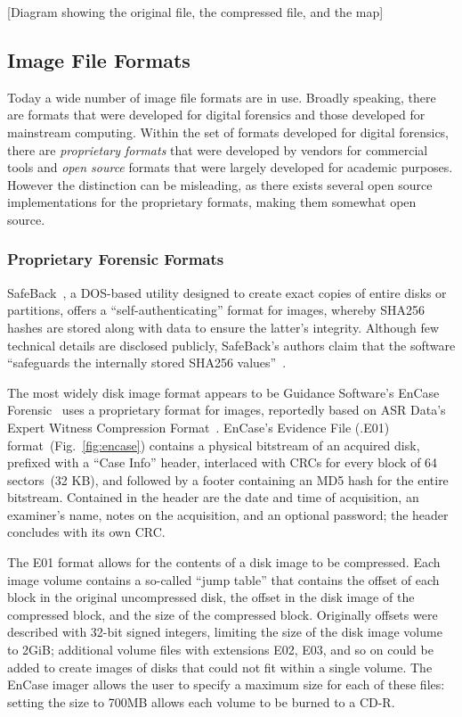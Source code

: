 [Diagram showing the original file, the compressed file, and the map]

\subsection{Image File Formats}
Today a wide number of image file formats are in use. Broadly
speaking, there are formats that were developed for digital forensics
and those developed for mainstream computing. Within the set of
formats developed for digital forensics, there are \emph{proprietary formats} that were developed by
vendors for commercial tools and \emph{open source} formats that were
largely developed for academic purposes. However the distinction can
be misleading, as there exists several open source implementations for
the proprietary formats, making them somewhat open source. 

\subsubsection{Proprietary Forensic Formats}

SafeBack~\cite{safeback}, a DOS-based utility designed to create
exact copies of entire disks or partitions, offers a
``self-authenticating'' format for images, whereby SHA256 hashes are
stored along with data to ensure the latter's integrity.  Although
few technical details are disclosed publicly, SafeBack's authors
claim that the software ``safeguards the internally stored SHA256
values''~\cite{safebacksafeguards}.


The most widely disk image format appears to be Guidance Software's EnCase Forensic~\cite{encase} uses
a proprietary format for images, reportedly based on ASR Data's
Expert Witness Compression Format~\cite{ew}.  EnCase's Evidence File
(.E01) format~(Fig.~\ref{fig:encase}) contains a physical bitstream
of an acquired disk, prefixed with a ``Case Info'' header,
interlaced with CRCs for every block of 64 sectors~(32 KB), and
followed by a footer containing an MD5 hash for the entire
bitstream.  Contained in the header are the date and time of
acquisition, an examiner's name, notes on the acquisition, and an
optional password; the header concludes with its own CRC. 

The E01 format allows for the contents of a disk image to be
compressed. Each image volume contains a so-called ``jump table'' that
contains the offset of each block in the original uncompressed disk,
the offset in the disk image of the compressed block, and the size of
the compressed block. Originally offsets were described with 32-bit
signed integers, limiting the size of the disk image volume to 2GiB;
additional volume files with extensions E02, E03, and so on could be
added to create images of disks that could not fit within a single
volume. The EnCase imager allows the user to specify a maximum size
for each of these files: setting the size to 700MB allows each volume
to be burned to a CD-R. 

